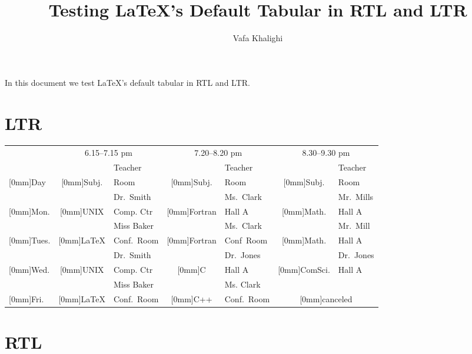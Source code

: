 \documentclass{article}
\title{Testing \LaTeX's Default Tabular in \textsf{RTL} and \textsf{LTR}}
\author{Vafa Khalighi}
\newcommand{\rb}[1]{\raisebox{1.5ex}[0mm]{#1}}
\begin{document}
\maketitle
In this document we test \LaTeX's default tabular in \textsf{RTL} and \textsf{LTR}.
\section{LTR}
\begin{center}\small
\begin{tabular}{|l||c|l|c|l|c|l|}
\hline
& \multicolumn{2}{c|}{6.15--7.15 pm} & \multicolumn{2}{c|}{7.20--8.20 pm}
& \multicolumn{2}{c|}{8.30--9.30 pm} \\ \cline{2-7}
&& Teacher && Teacher && Teacher \\ \cline{3-3}\cline{5-5}\cline{7-7}
\rb{Day} & \rb{Subj.} & Room & \rb{Subj.} & Room & \rb{Subj.} & Room\\
   \hline\hline
&& Dr.~Smith && Ms.~Clark && Mr.~Mills\\
\cline{3-3}\cline{5-5}\cline{7-7}
\rb{Mon.} & \rb{UNIX} & Comp. Ctr & \rb{Fortran} & Hall A
  & \rb{Math.} & Hall A \\ \hline
&& Miss Baker && Ms.~Clark && Mr.~Mill\\
\cline{3-3}\cline{5-5}\cline{7-7}
\rb{Tues.} & \rb{\LaTeX} & Conf.~Room & \rb{Fortran} & Conf~Room
  & \rb{Math.} & Hall A \\ \hline
&& Dr.~Smith && Dr.~Jones && Dr.~Jones \\
\cline{3-3}\cline{5-5}\cline{7-7}
\rb{Wed.} & \rb{UNIX} & Comp. Ctr & \rb{C} & Hall A
  & \rb{ComSci.} & Hall A \\ \hline
&& Miss Baker && Ms. Clark & \multicolumn{2}{c|}{} \\
\cline{3-3}\cline{5-5}
\rb{Fri.} & \rb{\LaTeX} & Conf.~Room & \rb{C++} & Conf.~Room
& \multicolumn{2}{c|}{\rb{canceled}}\\ \hline
\end{tabular}\end{center}
\section{RTL}
\end{document}
